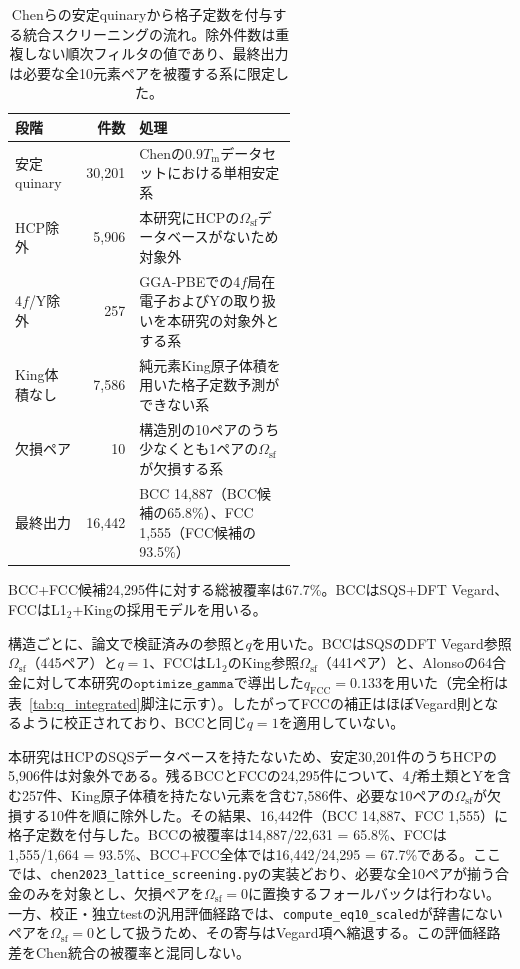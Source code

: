 \documentclass[5p,10pt]{elsarticle}
\begin{document}
\begin{table}[H]
\centering
\caption{Chenらの安定quinaryから格子定数を付与する統合スクリーニングの流れ。除外件数は重複しない順次フィルタの値であり、最終出力は必要な全10元素ペアを被覆する系に限定した。}
\label{tab:chen_screening_flow}
\scriptsize
\begin{tabular}{@{}lrp{0.56\linewidth}@{}}
\toprule
段階 & 件数 & 処理 \\
\midrule
安定quinary & 30,201 & Chenの$0.9T_\text{m}$データセットにおける単相安定系 \\
HCP除外 & 5,906 & 本研究にHCPの$\Omega_\text{sf}$データベースがないため対象外 \\
4$f$/Y除外 & 257 & GGA-PBEでの4$f$局在電子およびYの取り扱いを本研究の対象外とする系 \\
King体積なし & 7,586 & 純元素King原子体積を用いた格子定数予測ができない系 \\
欠損ペア & 10 & 構造別の10ペアのうち少なくとも1ペアの$\Omega_\text{sf}$が欠損する系 \\
\midrule
最終出力 & 16,442 & BCC 14,887（BCC候補の65.8\%）、FCC 1,555（FCC候補の93.5\%） \\
\bottomrule
\end{tabular}
\par\smallskip
{\scriptsize BCC+FCC候補24,295件に対する総被覆率は67.7\%。BCCはSQS+DFT Vegard、FCCはL1$_2$+Kingの採用モデルを用いる。}
\end{table}

構造ごとに、論文で検証済みの参照と$q$を用いた。BCCはSQSのDFT Vegard参照$\Omega_\text{sf}$（445ペア）と$q=1$、FCCはL1$_2$のKing参照$\Omega_\text{sf}$（441ペア）と、Alonsoの64合金に対して本研究の$\texttt{optimize\_gamma}$で導出した$q_\text{FCC}=0.133$を用いた（完全桁は表~\ref{tab:q_integrated}脚注に示す）。したがってFCCの補正はほぼVegard則となるように校正されており、BCCと同じ$q=1$を適用していない。

本研究はHCPのSQSデータベースを持たないため、安定30,201件のうちHCPの5,906件は対象外である。残るBCCとFCCの24,295件について、4$f$希土類とYを含む257件、King原子体積を持たない元素を含む7,586件、必要な10ペアの$\Omega_\text{sf}$が欠損する10件を順に除外した。その結果、16,442件（BCC 14,887、FCC 1,555）に格子定数を付与した。BCCの被覆率は14,887/22,631 = 65.8\%、FCCは1,555/1,664 = 93.5\%、BCC+FCC全体では16,442/24,295 = 67.7\%である。ここでは、\texttt{chen2023\_lattice\_screening.py}の実装どおり、必要な全10ペアが揃う合金のみを対象とし、欠損ペアを$\Omega_\text{sf}=0$に置換するフォールバックは行わない。一方、校正・独立testの汎用評価経路では、\texttt{compute\_eq10\_scaled}が辞書にないペアを$\Omega_\text{sf}=0$として扱うため、その寄与はVegard項へ縮退する。この評価経路差をChen統合の被覆率と混同しない。
\end{document}

